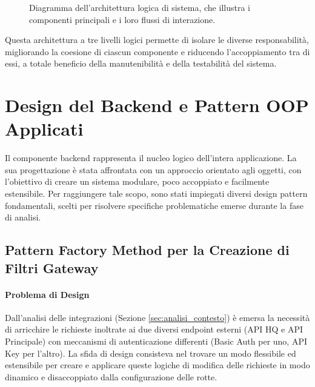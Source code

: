 \documentclass[12pt,a4paper,openright,twoside]{book}
\begin{document}
\vspace{1cm} %

\begin{figure}[h!]
    \centering
    \caption{Diagramma dell'architettura logica di sistema, che illustra i componenti principali e i loro flussi di interazione.}
    \label{fig:logical_architecture_diagram}
\end{figure}

\vspace{1cm} %

Questa architettura a tre livelli logici permette di isolare le diverse responsabilità, migliorando la coesione di ciascun componente e riducendo l'accoppiamento tra di essi, a totale beneficio della manutenibilità e della testabilità del sistema.
\section{Design del Backend e Pattern OOP Applicati}
\label{sec:design_backend_oop}

Il componente backend rappresenta il nucleo logico dell'intera applicazione. La sua progettazione è stata affrontata con un approccio orientato agli oggetti, con l'obiettivo di creare un sistema modulare, poco accoppiato e facilmente estensibile. Per raggiungere tale scopo, sono stati impiegati diversi design pattern fondamentali, scelti per risolvere specifiche problematiche emerse durante la fase di analisi.

\subsection{Pattern Factory Method per la Creazione di Filtri Gateway}
\label{subsec:design_factory}

\paragraph{Problema di Design}
Dall'analisi delle integrazioni (Sezione \ref{sec:analisi_contesto}) è emersa la necessità di arricchire le richieste inoltrate ai due diversi endpoint esterni (API HQ e API Principale) con meccanismi di autenticazione differenti (Basic Auth per uno, API Key per l'altro). La sfida di design consisteva nel trovare un modo flessibile ed estensibile per creare e applicare queste logiche di modifica delle richieste in modo dinamico e disaccoppiato dalla configurazione delle rotte.
\end{document}
